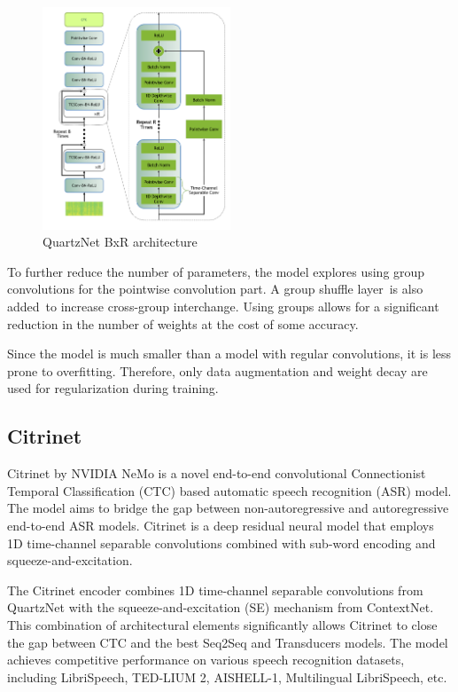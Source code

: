 \documentclass[conference]{IEEEtran}
\begin{document}
\begin{figure}[ht]
\centering
\includegraphics[width=0.5\textwidth]{QuartzNet.png}
\caption{QuartzNet BxR architecture}
\label{fig:QuartzNet_asr_architecture}
\end{figure}

To further reduce the number of parameters, the model explores using group convolutions for the pointwise convolution part. A group shuffle layer is also added to increase cross-group interchange. Using groups allows for a significant reduction in the number of weights at the cost of some accuracy.

Since the model is much smaller than a model with regular convolutions, it is less prone to overfitting. Therefore, only data augmentation and weight decay are used for regularization during training. 


\subsection{Citrinet\cite{Majumdar2021CitrinetCT}}

Citrinet by NVIDIA NeMo is a novel end-to-end convolutional Connectionist Temporal Classification (CTC) based automatic speech recognition (ASR) model. The model aims to bridge the gap between non-autoregressive and autoregressive end-to-end ASR models. Citrinet is a deep residual neural model that employs 1D time-channel separable convolutions combined with sub-word encoding and squeeze-and-excitation.

The Citrinet encoder combines 1D time-channel separable convolutions from QuartzNet with the squeeze-and-excitation (SE) mechanism from ContextNet. This combination of architectural elements significantly allows Citrinet to close the gap between CTC and the best Seq2Seq and Transducers models. The model achieves competitive performance on various speech recognition datasets, including LibriSpeech, TED-LIUM 2, AISHELL-1, Multilingual LibriSpeech, etc.
\end{document}
